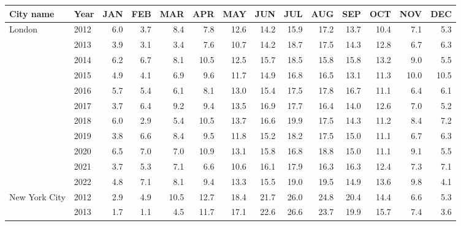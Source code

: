 \newpage
\begin{table}[htbp]
\small
\begin{adjustwidth}{-1in}{-1in} %
\centering
\begin{tabular}{llrrrrrrrrrrrr}
\toprule
      City name & Year  &      JAN &  FEB &   MAR &   APR &   MAY &   JUN &   JUL &   AUG &   SEP &   OCT &   NOV &   DEC \\
\midrule
London & 2012 &  6.0 &  3.7 &   8.4 &   7.8 &  12.6 &  14.2 &  15.9 &  17.2 &  13.7 &  10.4 &   7.1 &   5.3 \\
      & 2013 &  3.9 &  3.1 &   3.4 &   7.6 &  10.7 &  14.2 &  18.7 &  17.5 &  14.3 &  12.8 &   6.7 &   6.3 \\
      & 2014 &  6.2 &  6.7 &   8.1 &  10.5 &  12.5 &  15.7 &  18.5 &  15.8 &  15.8 &  13.2 &   9.0 &   5.5 \\
      & 2015 &  4.9 &  4.1 &   6.9 &   9.6 &  11.7 &  14.9 &  16.8 &  16.5 &  13.1 &  11.3 &  10.0 &  10.5 \\
      & 2016 &  5.7 &  5.4 &   6.1 &   8.1 &  13.0 &  15.4 &  17.5 &  17.8 &  16.7 &  11.1 &   6.4 &   6.1 \\
      & 2017 &  3.7 &  6.4 &   9.2 &   9.4 &  13.5 &  16.9 &  17.7 &  16.4 &  14.0 &  12.6 &   7.0 &   5.2 \\
      & 2018 &  6.0 &  2.9 &   5.4 &  10.5 &  13.7 &  16.6 &  19.9 &  17.5 &  14.3 &  11.2 &   8.4 &   7.2 \\
      & 2019 &  3.8 &  6.6 &   8.4 &   9.5 &  11.8 &  15.2 &  18.2 &  17.5 &  15.0 &  11.1 &   6.7 &   6.3 \\
      & 2020 &  6.5 &  7.0 &   7.0 &  10.9 &  13.1 &  15.8 &  16.8 &  18.8 &  15.0 &  11.1 &   9.1 &   5.5 \\
      & 2021 &  3.7 &  5.3 &   7.1 &   6.6 &  10.6 &  16.1 &  17.9 &  16.3 &  16.3 &  12.4 &   7.3 &   7.1 \\
      & 2022 &  4.8 &  7.1 &   8.1 &   9.4 &  13.3 &  15.5 &  19.0 &  19.5 &  14.9 &  13.6 &   9.8 &   4.1 \\
      \midrule
New York City & 2012 &  2.9 &  4.9 &  10.5 &  12.7 &  18.4 &  21.7 &  26.0 &  24.8 &  20.4 &  14.4 &   6.6 &   5.3 \\
      & 2013 &  1.7 &  1.1 &   4.5 &  11.7 &  17.1 &  22.6 &  26.6 &  23.7 &  19.9 &  15.7 &   7.4 &   3.6 \\

\end{tabular}
\end{adjustwidth}
\end{table}
